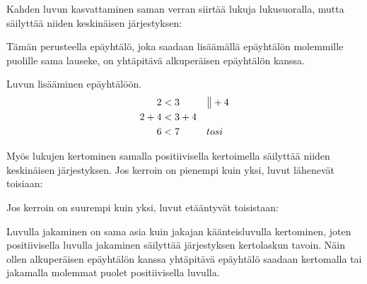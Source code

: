 Kahden luvun kasvattaminen saman verran siirtää lukuja lukusuoralla, mutta säilyttää niiden keskinäisen järjestyksen:

\begin{lukusuora}{-1}{10}{12}

\lukusuorauusi
\end{lukusuora}

Tämän perusteella epäyhtälö, joka saadaan lisäämällä epäyhtälön molemmille puolille sama lauseke, on yhtäpitävä alkuperäisen epäyhtälön kanssa.

\begin{esimerkki}
Luvun lisääminen epäyhtälöön.
  \begin{align*}
     2 &< 3 && \big\| +4\\
   2+4 &< 3+4  \\
     6 &< 7 && tosi
  \end{align*}
\end{esimerkki}

Myös lukujen kertominen samalla positiivisella kertoimella säilyttää niiden keskinäisen järjestyksen. Jos kerroin on pienempi kuin yksi, luvut lähenevät toisiaan:

\begin{lukusuora}{-1}{10}{12}

\lukusuorauusi
\end{lukusuora}

Jos kerroin on suurempi kuin yksi, luvut etääntyvät toisistaan:

\begin{lukusuora}{-1}{10}{12}

\lukusuorauusi
\end{lukusuora}

Luvulla jakaminen on sama asia kuin jakajan käänteisluvulla kertominen, joten positiivisella luvulla jakaminen säilyttää järjestyksen kertolaskun tavoin. Näin ollen alkuperäisen epäyhtälön kanssa yhtäpitävä epäyhtälö saadaan kertomalla tai jakamalla molemmat puolet positiivisella luvulla.

